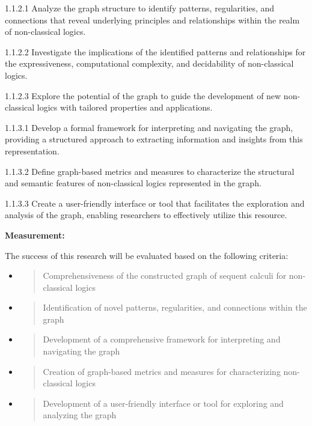 1.1.2.1 Analyze the graph structure to identify patterns, regularities,
and connections that reveal underlying principles and relationships
within the realm of non-classical logics.

1.1.2.2 Investigate the implications of the identified patterns and
relationships for the expressiveness, computational complexity, and
decidability of non-classical logics.

1.1.2.3 Explore the potential of the graph to guide the development of
new non-classical logics with tailored properties and applications.

1.1.3.1 Develop a formal framework for interpreting and navigating the
graph, providing a structured approach to extracting information and
insights from this representation.

1.1.3.2 Define graph-based metrics and measures to characterize the
structural and semantic features of non-classical logics represented in
the graph.

1.1.3.3 Create a user-friendly interface or tool that facilitates the
exploration and analysis of the graph, enabling researchers to
effectively utilize this resource.

\textbf{Measurement:}

The success of this research will be evaluated based on the following
criteria:

\begin{itemize}
\item
  \begin{quote}
  Comprehensiveness of the constructed graph of sequent calculi for
  non-classical logics
  \end{quote}
\item
  \begin{quote}
  Identification of novel patterns, regularities, and connections within
  the graph
  \end{quote}
\item
  \begin{quote}
  Development of a comprehensive framework for interpreting and
  navigating the graph
  \end{quote}
\item
  \begin{quote}
  Creation of graph-based metrics and measures for characterizing
  non-classical logics
  \end{quote}
\item
  \begin{quote}
  Development of a user-friendly interface or tool for exploring and
  analyzing the graph
  \end{quote}
\end{itemize}

